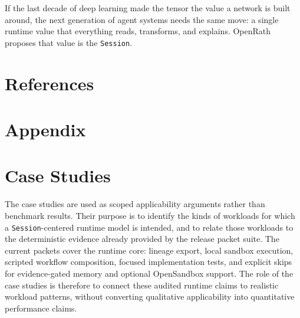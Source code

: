 \documentclass{llmxive}
\providecommand{\bibsection}{}
\begin{document}
If the last decade of deep learning made the tensor the value a network is
built around, the next generation of agent systems needs the same move: a
single runtime value that everything reads, transforms, and explains. OpenRath
proposes that value is the \texttt{Session}.



\section*{References}
\renewcommand{\bibsection}{}




\appendix
\section*{Appendix}

\section{Case Studies}
\label{app:case-studies}

The case studies are used as scoped applicability arguments rather than benchmark results. Their purpose is to identify the kinds of workloads for which a \texttt{Session}-centered runtime model is intended, and to relate those workloads to the deterministic evidence already provided by the release packet suite. The current packets cover the runtime core: lineage export, local sandbox execution, scripted workflow composition, focused implementation tests, and explicit skips for evidence-gated memory and optional OpenSandbox support. The role of the case studies is therefore to connect these audited runtime claims to realistic workload patterns, without converting qualitative applicability into quantitative performance claims.
\end{document}
